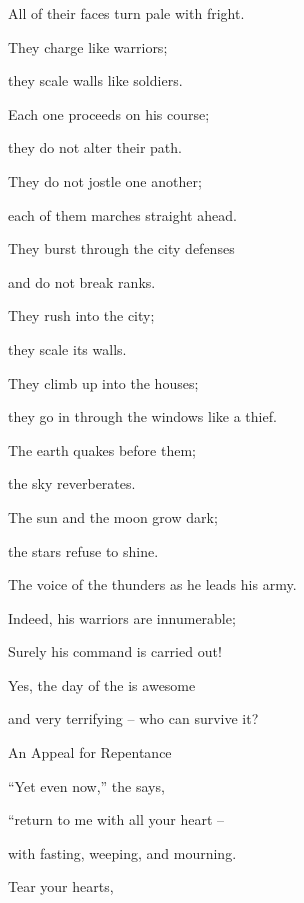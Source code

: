 {\par }{\Q All
of their faces
turn
pale with fright.
\par }{\Q {}They charge
like warriors;
\par }{\Q they scale
walls
like soldiers.
\par }{\Q Each
one proceeds on
his course;
\par }{\Q they do not
alter
their path.
\par }{\Q {}They
do not
jostle
one another;
\par }{\Q each of them
marches
straight ahead.
\par }{\Q They burst
through
the city defenses
\par }{\Q and do not
break ranks.
\par }{\Q {}They rush into
the city;
\par }{\Q they scale
its walls.
\par }{\Q They climb up
into the houses;
\par }{\Q they go in
through the windows
like a thief.
\par }{\Q {}The earth
quakes
before
them;

\par }{\Q the sky
reverberates.
\par }{\Q The sun
and the moon
grow dark;
\par }{\Q the stars
refuse
to shine.
\par }{\Q {}The voice
of the
{}
thunders
as he leads
his army.
\par }{\Q Indeed,
his warriors are innumerable;
\par }{\Q Surely
his command
is carried
out!

\par }{\Q Yes,
the day
of the
{}
is awesome
\par }{\Q and very
terrifying
– who can
survive it?
\par }{\SH An Appeal for Repentance
\par }{\Q {}“Yet even
now,”
the {}
says,
\par }{\Q “return
to
me with all
your heart
–
\par }{\Q with fasting,
weeping,
and mourning.
\par }{\Q Tear your hearts,

}
